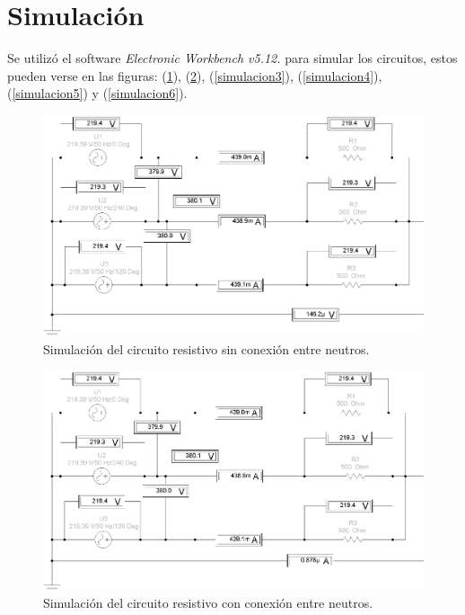 \documentclass[letter,11pt]{article}
\begin{document}
\section{Simulación}
Se utilizó el software \emph{Electronic Workbench v5.12.} para simular
los circuitos, estos pueden verse en las figuras: (\ref{simulacion1}),
(\ref{simulacion2}), (\ref{simulacion3}), (\ref{simulacion4}),
(\ref{simulacion5}) y (\ref{simulacion6}).

\begin{figure}[!h]
\centering
\includegraphics[scale=0.88]{simulacion/practica1.1.eps}
\caption{Simulación del circuito resistivo sin conexión entre neutros.}
\label{simulacion1}
\end{figure}

\begin{figure}[!h]
\centering
\includegraphics[scale=0.88]{simulacion/practica1.2.eps}
\caption{Simulación del circuito resistivo con conexión entre neutros.}
\label{simulacion2}
\end{figure}

\newpage
\end{document}
